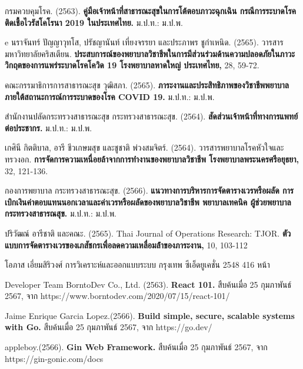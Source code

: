 \thispagestyle{empty} %

\begin{thebibliography}{99}

    กรมควบคุมโรค. (2563). \textbf{คู่มือเจ้าหน้าที่สาธารณะสุขในการโต้ตอบภาวะฉุกเฉิน กรณีการระบาดโรคติดเชื้อไวรัสโคโรนา 2019 ในประเทศไทย.} ม.ป.ท.: ม.ป.พ.

    e
    นราจันทร์ ปัญญาวุทโส, ปรัชญานันท์ เที่ยงจรรยา และประภาพร ชูกำเหนิด. (2565). วารสารมหาวิทยาลัยคริสเตียน. \textbf{ประสบการณ์ของพยาบาลวิชาชีพในการมีส่วนร่วมด้านความปลอดภัยในภาวะวิกฤตของการแพร่ระบาดโรคโควิด 19 โรงพยาบาลหาดใหญ่ ประเทศไทย,} 28, 59-72.

    คณะกรรมาธิการการสาธารณะสุข วุฒิสภา. (2565). \textbf{ภาระงานและประสิทธิภาพของวิชาชีพพยาบาล ภายใต้สถานะการณ์การระบาดของโรค COVID 19.} ม.ป.ท.: ม.ป.พ.

    สำนักงานปลัดกระทรวงสาธารณะสุข กระทรวงสาธารณะสุข. (2564). \textbf{สัดส่วนเจ้าหน้าที่ทางการแพทย์ต่อประชากร.} ม.ป.ท.: ม.ป.พ.

    เกศินี กิตติบาล, อารี ชีวเกษมสุข และชูชาติ พ่วงสมจิตร์. (2564). วารสารพยาบาลโรคหัวใจและทรวงอก. \textbf{การจัดการความเหนื่อยล้าจากการทํางานของพยาบาลวิชาชีพ โรงพยาบาลพระนครศรีอยุธยา,} 32, 121-136.

    กองการพยาบาล กระทรวงสาธารณะสุข. (2566). \textbf{แนวทางการบริหารการจัดตารางเวรหรือผลัด การเบิกเงินค่าตอบแทนนอกเวลาและค่าเวรหรือผลัดของพยาบาลวิชาชีพ พยาบาลเทคนิค ผู้ช่วยพยาบาล กระทรวงสาธารณสุข.} ม.ป.ท.: ม.ป.พ.

    ปริวัฒณ์ อารีชาติ และคณะ. (2565). Thai Journal of Operations Research: TJOR. \textbf{ตัวแบบการจัดตารางเวรของเภสัชกรเพื่อลดความเหลื่อมล้ําของภาระงาน,} 10, 103-112


    โอภาส เอี่ยมสิริวงศ์ การวิเคราะห์และออกแบบระบบ กรุงเทพ ซีเอ็ดยูเคชั่น 2548 416 หน้า
    

Developer Team BorntoDev Co., Ltd. (2563). \textbf{React 101.} สืบค้นเมื่อ 25 กุมภาพันธ์ 2567, จาก https://www.borntodev.com/2020/07/15/react-101/

Jaime Enrique Garcia Lopez.(2566). \textbf{Build simple, secure, scalable systems with Go.} สืบค้นเมื่อ 25 กุมภาพันธ์ 2567, จาก https://go.dev/



appleboy.(2566). \textbf{Gin Web Framework.} สืบค้นเมื่อ 25 กุมภาพันธ์ 2567, จาก https://gin-gonic.com/docs


\end{thebibliography}
